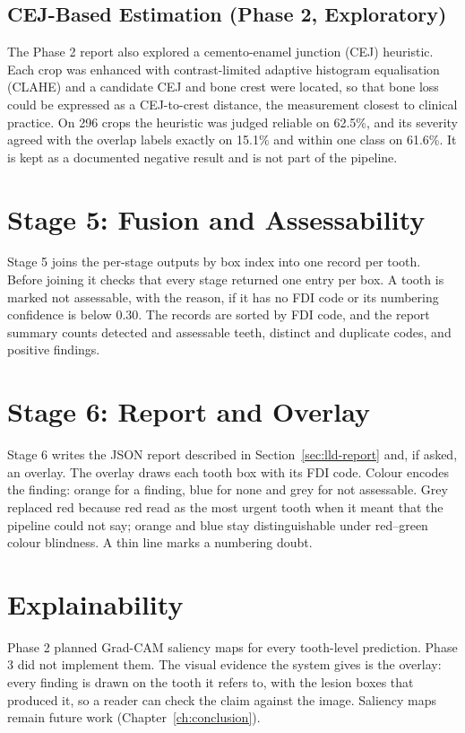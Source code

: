 \subsection{CEJ-Based Estimation (Phase 2, Exploratory)}

The Phase 2 report also explored a cemento-enamel junction (CEJ) heuristic. Each crop was enhanced
with contrast-limited adaptive histogram equalisation (CLAHE) and a candidate CEJ and bone crest were located, so that bone loss could be expressed as a
CEJ-to-crest distance, the measurement closest to clinical practice. On 296 crops the heuristic was
judged reliable on 62.5\%, and its severity agreed with the overlap labels exactly on 15.1\% and within
one class on 61.6\%. It is kept as a documented negative result and is not part of the pipeline. %

\section{Stage 5: Fusion and Assessability}

Stage 5 joins the per-stage outputs by box index into one record per tooth. Before joining it checks
that every stage returned one entry per box. A tooth is marked not assessable, with the reason, if it
has no FDI code or its numbering confidence is below 0.30. The records are sorted by FDI code, and the
report summary counts detected and assessable teeth, distinct and duplicate codes, and positive
findings.

\section{Stage 6: Report and Overlay}

Stage 6 writes the JSON report described in Section~\ref{sec:lld-report} and, if asked, an overlay. The
overlay draws each tooth box with its FDI code. Colour encodes the finding: orange for a finding, blue
for none and grey for not assessable. Grey replaced red because red read as the most urgent tooth when
it meant that the pipeline could not say; orange and blue stay distinguishable under red--green colour
blindness. A thin line marks a numbering doubt.

\section{Explainability}

Phase 2 planned Grad-CAM saliency maps for every tooth-level prediction. Phase 3 did not implement
them. The visual evidence the system gives is the overlay: every finding is drawn on the tooth it
refers to, with the lesion boxes that produced it, so a reader can check the claim against the image.
Saliency maps remain future work (Chapter~\ref{ch:conclusion}).
